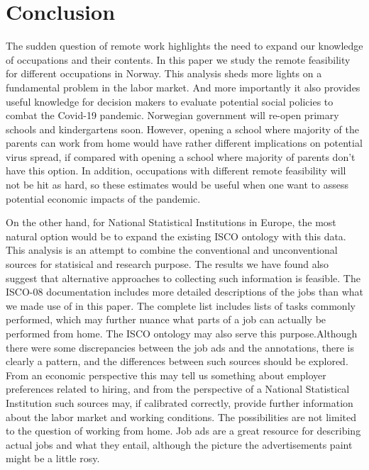 \documentclass[11pt,]{article}
\begin{document}
\hypertarget{conclusion}{%
\section{Conclusion}\label{conclusion}}

The sudden question of remote work highlights the need to expand our
knowledge of occupations and their contents. In this paper we study the
remote feasibility for different occupations in Norway. This analysis
sheds more lights on a fundamental problem in the labor market. And more
importantly it also provides useful knowledge for decision makers to
evaluate potential social policies to combat the Covid-19 pandemic.
Norwegian government will re-open primary schools and kindergartens
soon. However, opening a school where majority of the parents can work
from home would have rather different implications on potential virus
spread, if compared with opening a school where majority of parents
don't have this option. In addition, occupations with different remote
feasibility will not be hit as hard, so these estimates would be useful
when one want to assess potential economic impacts of the pandemic.

On the other hand, for National Statistical Institutions in Europe, the
most natural option would be to expand the existing ISCO ontology with
this data. This analysis is an attempt to combine the conventional and
unconventional sources for statisical and research purpose. The results
we have found also suggest that alternative approaches to collecting
such information is feasible. The ISCO-08 documentation includes more
detailed descriptions of the jobs than what we made use of in this
paper. The complete list includes lists of tasks commonly performed,
which may further nuance what parts of a job can actually be performed
from home. The ISCO ontology may also serve this purpose.Although there
were some discrepancies between the job ads and the annotations, there
is clearly a pattern, and the differences between such sources should be
explored. From an economic perspective this may tell us something about
employer preferences related to hiring, and from the perspective of a
National Statistical Institution such sources may, if calibrated
correctly, provide further information about the labor market and
working conditions. The possibilities are not limited to the question of
working from home. Job ads are a great resource for describing actual
jobs and what they entail, although the picture the advertisements paint
might be a little rosy.
\end{document}
